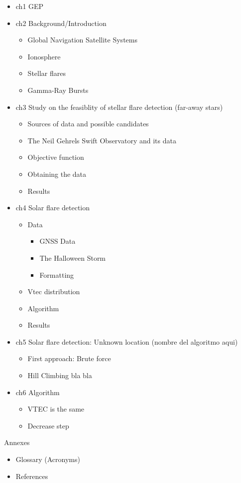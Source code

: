 \begin{itemize}
	\item ch1 GEP
	\item ch2 Background/Introduction
	\begin{itemize}
		\item Global Navigation Satellite Systems
		\item Ionosphere
		\item Stellar flares
		\item  Gamma-Ray Bursts
	\end{itemize}
	\item ch3 Study on the feasiblity of stellar flare detection (far-away stars)
	\begin{itemize}
		\item Sources of data and possible candidates
		\item The Neil Gehrels Swift Observatory and its data 
		\item Objective function
		\item Obtaining the data
		\item Results
	\end{itemize}
	\item ch4 Solar flare detection
	\begin{itemize}
		\item Data
		\begin{itemize}
			\item GNSS Data
			\item The Halloween Storm
			\item Formatting
		\end{itemize}
		\item Vtec distribution
		\item Algorithm
		\item Results
	\end{itemize}
	\item ch5 Solar flare detection: Unknown location (nombre del algoritmo aqui)
	\begin{itemize}
		\item First approach: Brute force
		\item Hill Climbing bla bla
	\end{itemize}
	\item ch6 Algorithm
	\begin{itemize}
		\item VTEC is the same
		\item Decrease step
	\end{itemize}
\end{itemize}

Annexes

\begin{itemize}
	\item Glossary (Acronyms)
	\item References
\end{itemize}


